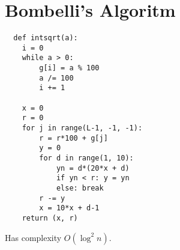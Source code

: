 \documentclass[10pt, a4paper]{report}
\begin{document}
\section{Bombelli's Algoritm}
\begin{verbatim}
  def intsqrt(a):
    i = 0
    while a > 0:
        g[i] = a % 100
        a /= 100
        i += 1

    x = 0
    r = 0
    for j in range(L-1, -1, -1):
        r = r*100 + g[j]
        y = 0
        for d in range(1, 10):
            yn = d*(20*x + d)
            if yn < r: y = yn
            else: break
        r -= y
        x = 10*x + d-1
    return (x, r)
\end{verbatim}
Has complexity $O(\log ^2 n)$.
\end{document}
